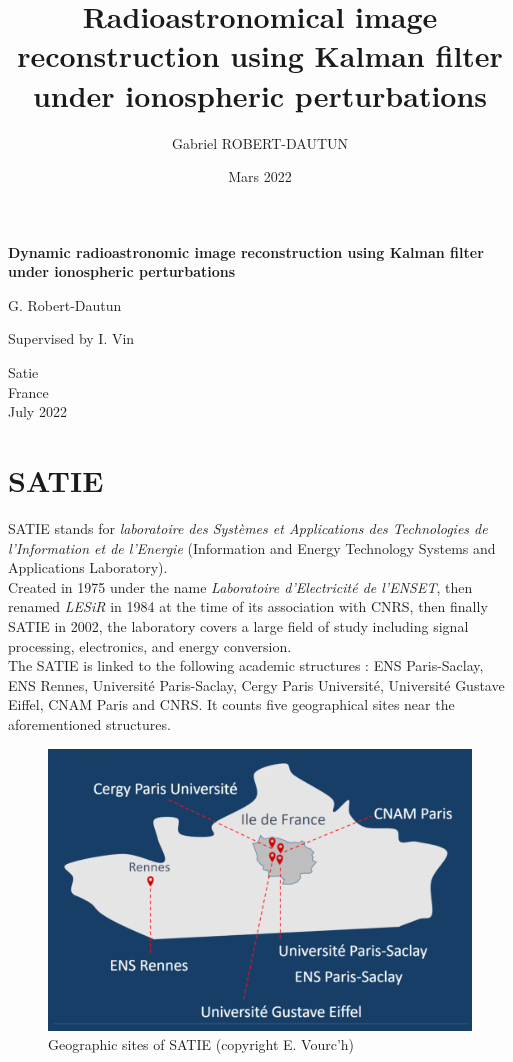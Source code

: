 \documentclass[titlepage]{article}
\author{Gabriel ROBERT-DAUTUN}
\date{Mars 2022}
\title{%
	Radioastronomical image reconstruction using Kalman filter under ionospheric perturbations}
\begin{document}
	
	\begin{titlepage}
	
	\vspace*{.3\textheight}
	\huge
	\centering
	\textbf{Dynamic radioastronomic image reconstruction using Kalman filter under ionospheric perturbations}
	
	\vspace{1cm}
	\LARGE
	G. Robert-Dautun
	
	\vfill
	\large
	Supervised by I. Vin
	
	\vspace{0.8cm}
	
	\Large
	Satie\\
	France\\
	July 2022
	
	\end{titlepage}
	
	\newpage
	\tableofcontents
	
		\newpage
	\part{SATIE}
	
	SATIE stands for \emph{laboratoire des Systèmes et Applications des Technologies de l'Information et de l'Energie} (Information and Energy Technology Systems and Applications Laboratory).\\
	Created in 1975 under the name \emph{Laboratoire d'Electricité de l'ENSET}, then renamed \emph{LESiR} in 1984 at the time of its association with CNRS, then finally SATIE in 2002, the laboratory covers a large field of study including signal processing, electronics, and energy conversion.\\
	
	The SATIE is linked to the following academic structures : ENS Paris-Saclay, ENS Rennes, Université Paris-Saclay, Cergy Paris Université, Université Gustave Eiffel, CNAM Paris and CNRS. It counts five geographical sites near the aforementioned structures. 
	
	\begin{figure}[H]
		\centering
		\includegraphics[width=0.7\linewidth]{src/sites_geoo_satie}
		\caption{Geographic sites of SATIE (copyright E. Vourc'h)}
		\label{fig:sitesgeoosatie}
	\end{figure}
	
\end{document}
